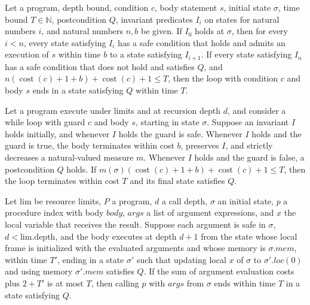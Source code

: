 \begin{theorem}
\label{Light.Ends.whileConst}
\leanok
{}
Let a program, depth bound, condition $c$, body statement $s$, initial state $\sigma$,
time bound $T\in\mathbb N$, postcondition $Q$, invariant predicates $I_i$ on states for
natural numbers $i$, and natural numbers $n,b$ be given. If $I_0$ holds at $\sigma$,
then for every $i<n$, every state satisfying $I_i$ has a safe condition that holds and
admits an execution of $s$ within time $b$ to a state satisfying $I_{i+1}$. If every
state satisfying $I_n$ has a safe condition that does not hold and satisfies $Q$, and
$n(\operatorname{cost}(c)+1+b)+\operatorname{cost}(c)+1\le T$, then the loop with
condition $c$ and body $s$ ends in a state satisfying $Q$ within time $T$.
\end{theorem}

\begin{theorem}
\label{Light.Ends.whileVariant}
\leanok
{}
Let a program execute under limits and at recursion depth $d$, and consider a while loop
with guard $c$ and body $s$, starting in state $\sigma$. Suppose an invariant $I$ holds
initially, and whenever $I$ holds the guard is safe. Whenever $I$ holds and the guard is
true, the body terminates within cost $b$, preserves $I$, and strictly decreases a
natural-valued measure $m$. Whenever $I$ holds and the guard is false, a postcondition
$Q$ holds. If $m(\sigma)(\operatorname{cost}(c)+1+b)+\operatorname{cost}(c)+1\le T$,
then the loop terminates within cost $T$ and its final state satisfies $Q$.
\end{theorem}

\begin{theorem}
\label{Light.Ends.call}
\leanok
{}
Let $\mathrm{lim}$ be resource limits, $P$ a program, $d$ a call depth, $\sigma$ an initial
state, $p$ a procedure index with body $body$, $args$ a list of argument expressions, and
$x$ the local variable that receives the result. Suppose each argument is safe in $\sigma$,
$d<\mathrm{lim.depth}$, and the body executes at depth $d+1$ from the state whose local
frame is initialized with the evaluated arguments and whose memory is $\sigma.mem$, within
time $T\prime$, ending in a state $\sigma\prime$ such that updating local $x$ of $\sigma$
to $\sigma\prime.loc(0)$ and using memory $\sigma\prime.mem$ satisfies $Q$. If the sum
of argument evaluation costs plus $2+T\prime$ is at most $T$, then calling $p$ with
$args$ from $\sigma$ ends within time $T$ in a state satisfying $Q$.
\end{theorem}

